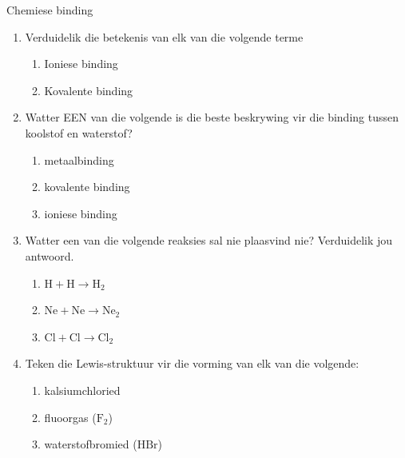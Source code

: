 \label{m38689*secfhsst!!!underscore!!!id1181}
            \begin{eocexercises}{Chemiese binding}
            \nopagebreak
      \label{m38689*id147820}\begin{enumerate}[noitemsep, label=\textbf{\arabic*}. ] 
            \label{m38689*uid158}\item Verduidelik die betekenis van elk van die volgende terme
\label{m38689*id147842}\begin{enumerate}[noitemsep, label=\textbf{\alph*}. ] 
            \label{m38689*uid159}\item Ioniese binding
\label{m38689*uid160}\item Kovalente binding
\end{enumerate}
                \label{m38689*uid162}\item Watter EEN van die volgende is die beste beskrywing vir die binding tussen koolstof en waterstof?
\label{m38689*id147923}\begin{enumerate}[noitemsep, label=\textbf{\alph*}. ] 
            \label{m38689*uid163}\item metaalbinding
\label{m38689*uid164}\item kovalente binding
\label{m38689*uid165}\item ioniese binding
\end{enumerate}
                \label{m38689*uid171}\item Watter een van die volgende reaksies sal nie plaasvind nie? Verduidelik jou antwoord.
\label{m38689*id148047}\begin{enumerate}[noitemsep, label=\textbf{\alph*}. ] 
            \label{m38689*uid172}\item $\mathrm{H}+\mathrm{H}\to {\mathrm{H}}_{2}$\label{m38689*uid173}\item $\mathrm{Ne}+\mathrm{Ne}\to {\mathrm{Ne}}_{2}$\label{m38689*uid174}\item $\mathrm{Cl}+\mathrm{Cl}\to {\mathrm{Cl}}_{2}$\end{enumerate}
                \label{m38689*uid175}\item Teken die Lewis-struktuur vir die vorming van elk van die volgende:
\label{m38689*id148172}\begin{enumerate}[noitemsep, label=\textbf{\alph*}. ] 
            \label{m38689*uid176}\item kalsiumchloried
\label{m38689*uid177}\item fluoorgas ($\text{F}_2$)
\label{m38689*uid178}\item waterstofbromied ($\text{HBr}$)

\end{enumerate}
\end{enumerate}
\end{eocexercises}
